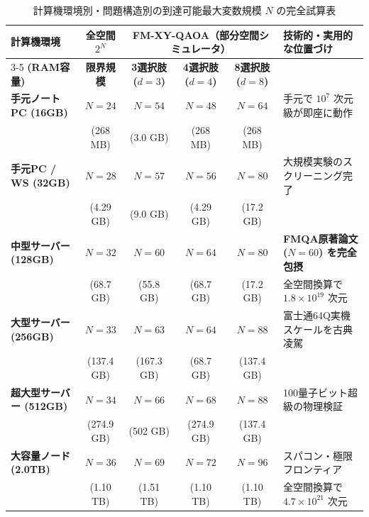 \documentclass[11pt,a4paper]{ltjsarticle}
\begin{document}
\begin{table}[H]
\centering
\caption{計算機環境別・問題構造別の到達可能最大変数規模 $N$ の完全試算表}\label{tab:server_scaling}
\vspace{-1mm}
\scriptsize
\begin{tabularx}{\textwidth}{l c c c c X}
\toprule
\textbf{計算機環境} & \textbf{全空間 $2^N$} & \multicolumn{3}{c}{\textbf{FM-XY-QAOA（部分空間シミュレータ）}} & \textbf{技術的・実用的な位置づけ} \\
\cmidrule(lr){3-5}
\textbf{(RAM容量)} & \textbf{限界規模} & \textbf{3選択肢 ($d=3$)} & \textbf{4選択肢 ($d=4$)} & \textbf{8選択肢 ($d=8$)} & \\
\midrule
\textbf{手元ノートPC (16GB)} & $N = 24$ & $N = 54$ & $N = 48$ & $N = 64$ & 手元で $10^7$ 次元級が即座に動作 \\
& (268 MB) & (3.0 GB) & (268 MB) & (268 MB) & \\
\midrule
\textbf{手元PC / WS (32GB)} & $N = 28$ & $N = 57$ & $N = 56$ & $N = 80$ & 大規模実験のスクリーニング完了 \\
& (4.29 GB) & (9.0 GB) & (4.29 GB) & (17.2 GB) & \\
\midrule
\textbf{中型サーバー (128GB)} & $N = 32$ & \textbf{$N = 60$} & \textbf{$N = 64$} & \textbf{$N = 80$} & \textbf{FMQA原著論文 ($N=60$) を完全包摂} \\
& (68.7 GB) & (55.8 GB) & (68.7 GB) & (17.2 GB) & 全空間換算で $1.8 \times 10^{19}$ 次元 \\
\midrule
\textbf{大型サーバー (256GB)} & $N = 33$ & $N = 63$ & $N = 64$ & $N = 88$ & 富士通64Q実機スケールを古典凌駕 \\
& (137.4 GB) & (167.3 GB) & (68.7 GB) & (137.4 GB) & \\
\midrule
\textbf{超大型サーバー (512GB)} & $N = 34$ & $N = 66$ & $N = 68$ & $N = 88$ & 100量子ビット超級の物理検証 \\
& (274.9 GB) & (502 GB) & (274.9 GB) & (137.4 GB) & \\
\midrule
\textbf{大容量ノード (2.0TB)} & $N = 36$ & $N = 69$ & \textbf{$N = 72$} & \textbf{$N = 96$} & スパコン・極限フロンティア \\
& (1.10 TB) & (1.51 TB) & (1.10 TB) & (1.10 TB) & 全空間換算で $4.7 \times 10^{21}$ 次元 \\
\bottomrule
\end{tabularx}
\end{table}

\vspace{-2.5mm}
\end{document}
